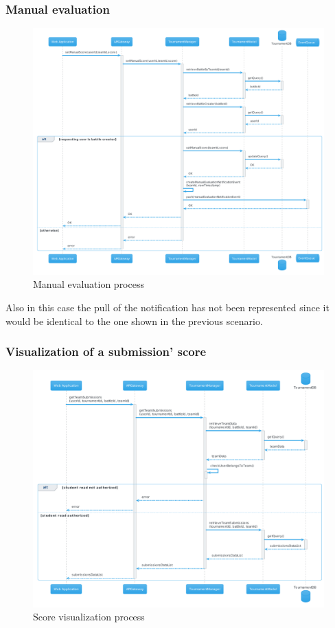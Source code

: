 \newpage
\subsubsection{Manual evaluation}
\begin{figure}[H]
    \hspace{-1.5cm}
    \includegraphics[width=1.2\textwidth]{Diagrams/sequence/manual_evaluate_submission.png}
    \caption{Manual evaluation process}
\end{figure}
Also in this case the pull of the notification has not been represented since it would be identical to the one shown in the previous scenario.

\subsubsection{Visualization of a submission' score}
\begin{figure}[H]
    \hspace{-1.5cm}
    \includegraphics[width=1.2\textwidth]{Diagrams/sequence/visualize_score.png}
    \caption{Score visualization process}
\end{figure}

